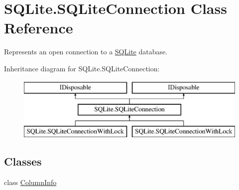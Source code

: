 \hypertarget{classSQLite_1_1SQLiteConnection}{\section{S\-Q\-Lite.\-S\-Q\-Lite\-Connection Class Reference}
\label{classSQLite_1_1SQLiteConnection}
}


Represents an open connection to a \hyperlink{namespaceSQLite}{S\-Q\-Lite} database.  


Inheritance diagram for S\-Q\-Lite.\-S\-Q\-Lite\-Connection\-:\begin{figure}[H]
\begin{center}
\leavevmode
\includegraphics[height=3.000000cm]{classSQLite_1_1SQLiteConnection}
\end{center}
\end{figure}
\subsection*{Classes}
\begin{DoxyCompactItemize}
\item 
class \hyperlink{classSQLite_1_1SQLiteConnection_1_1ColumnInfo}{Column\-Info}
\end{DoxyCompactItemize}
